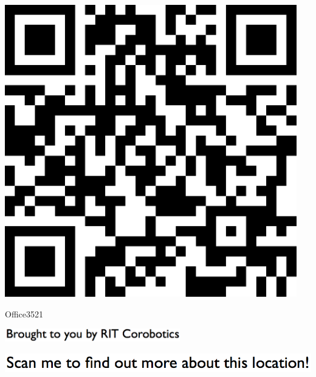 \documentclass[letterpaper]{article}
\begin{document}
 \begingroup 
 \centerline{\includegraphics[scale=1,width=5in,height=5in]{Office3521.png}} 
 \endgroup 
 \vspace*{\fill} 

 \hfill{\small Office3521} 

  \vspace{0.7in} 
 
 \centerline{\includegraphics[scale=1,width=3in]{text-bottom.png}} 
 
 \pagebreak 
{} 
 \vspace*{\fill} 
 
  \centerline{\includegraphics[scale=1,width=6in]{text-top.png}} 
 
 \vspace{0.5in} 
 
\end{document}
